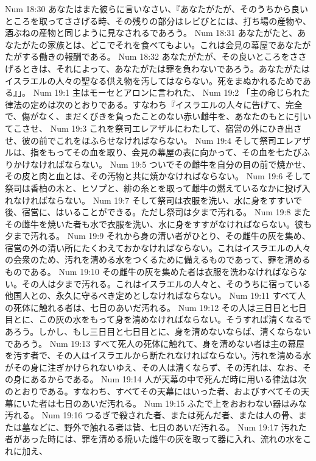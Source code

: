 Num 18:30  あなたはまた彼らに言いなさい、『あなたがたが、そのうちから良いところを取ってささげる時、その残りの部分はレビびとには、打ち場の産物や、酒ぶねの産物と同じように見なされるであろう。
Num 18:31  あなたがたと、あなたがたの家族とは、どこでそれを食べてもよい。これは会見の幕屋であなたがたがする働きの報酬である。
Num 18:32  あなたがたが、その良いところをささげるときは、それによって、あなたがたは罪を負わないであろう。あなたがたはイスラエルの人々の聖なる供え物を汚してはならない。死をまぬかれるためである』」。
Num 19:1  主はモーセとアロンに言われた、
Num 19:2  「主の命じられた律法の定めは次のとおりである。すなわち『イスラエルの人々に告げて、完全で、傷がなく、まだくびきを負ったことのない赤い雌牛を、あなたのもとに引いてこさせ、
Num 19:3  これを祭司エレアザルにわたして、宿営の外にひき出させ、彼の前でこれをほふらせなければならない。
Num 19:4  そして祭司エレアザルは、指をもってその血を取り、会見の幕屋の表に向かって、その血を七たびふりかけなければならない。
Num 19:5  ついでその雌牛を自分の目の前で焼かせ、その皮と肉と血とは、その汚物と共に焼かなければならない。
Num 19:6  そして祭司は香柏の木と、ヒソプと、緋の糸とを取って雌牛の燃えているなかに投げ入れなければならない。
Num 19:7  そして祭司は衣服を洗い、水に身をすすいで後、宿営に、はいることができる。ただし祭司は夕まで汚れる。
Num 19:8  またその雌牛を焼いた者も水で衣服を洗い、水に身をすすがなければならない。彼も夕まで汚れる。
Num 19:9  それから身の清い者がひとり、その雌牛の灰を集め、宿営の外の清い所にたくわえておかなければならない。これはイスラエルの人々の会衆のため、汚れを清める水をつくるために備えるものであって、罪を清めるものである。
Num 19:10  その雌牛の灰を集めた者は衣服を洗わなければならない。その人は夕まで汚れる。これはイスラエルの人々と、そのうちに宿っている他国人との、永久に守るべき定めとしなければならない。
Num 19:11  すべて人の死体に触れる者は、七日のあいだ汚れる。
Num 19:12  その人は三日目と七日目とに、この灰の水をもって身を清めなければならない。そうすれば清くなるであろう。しかし、もし三日目と七日目とに、身を清めないならば、清くならないであろう。
Num 19:13  すべて死人の死体に触れて、身を清めない者は主の幕屋を汚す者で、その人はイスラエルから断たれなければならない。汚れを清める水がその身に注ぎかけられないゆえ、その人は清くならず、その汚れは、なお、その身にあるからである。
Num 19:14  人が天幕の中で死んだ時に用いる律法は次のとおりである。すなわち、すべてその天幕にはいった者、およびすべてその天幕にいた者は七日のあいだ汚れる。
Num 19:15  ふたで上をおおわない器はみな汚れる。
Num 19:16  つるぎで殺された者、または死んだ者、または人の骨、または墓などに、野外で触れる者は皆、七日のあいだ汚れる。
Num 19:17  汚れた者があった時には、罪を清める焼いた雌牛の灰を取って器に入れ、流れの水をこれに加え、
